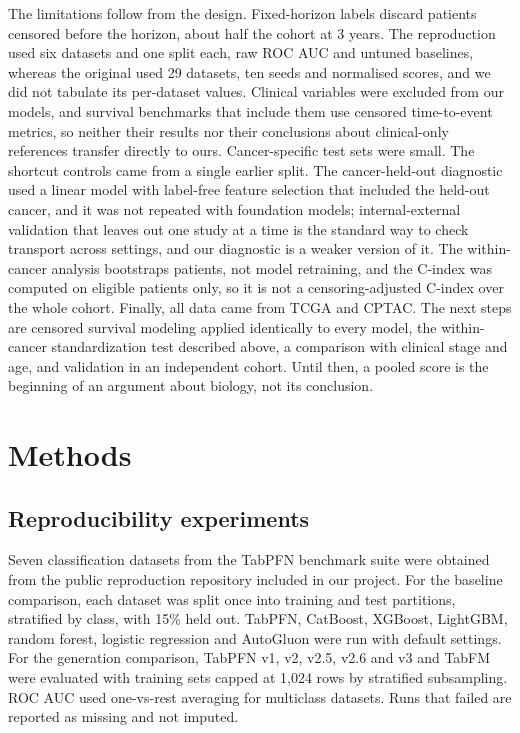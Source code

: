 \documentclass[11pt, a4paper, onecolumn, confidential, copyright]{hawkfranklin}
\begin{document}
The limitations follow from the design. Fixed-horizon labels discard patients censored before the horizon, about half the cohort at 3 years. The reproduction used six datasets and one split each, raw ROC AUC and untuned baselines, whereas the original used 29 datasets, ten seeds and normalised scores, and we did not tabulate its per-dataset values. Clinical variables were excluded from our models, and survival benchmarks that include them use censored time-to-event metrics, so neither their results nor their conclusions about clinical-only references transfer directly to ours.\citep{herrmann2021benchmark,li2024combining} Cancer-specific test sets were small. The shortcut controls came from a single earlier split. The cancer-held-out diagnostic used a linear model with label-free feature selection that included the held-out cancer, and it was not repeated with foundation models; internal-external validation that leaves out one study at a time is the standard way to check transport across settings,\citep{riley2016external} and our diagnostic is a weaker version of it. The within-cancer analysis bootstraps patients, not model retraining, and the C-index was computed on eligible patients only, so it is not a censoring-adjusted C-index over the whole cohort. Finally, all data came from TCGA and CPTAC. The next steps are censored survival modeling applied identically to every model, the within-cancer standardization test described above, a comparison with clinical stage and age, and validation in an independent cohort. Until then, a pooled score is the beginning of an argument about biology, not its conclusion.

\section*{Methods}

\subsection*{Reproducibility experiments}
Seven classification datasets from the TabPFN benchmark suite were obtained from the public reproduction repository included in our project. For the baseline comparison, each dataset was split once into training and test partitions, stratified by class, with 15\% held out. TabPFN, CatBoost, XGBoost, LightGBM, random forest, logistic regression and AutoGluon were run with default settings. For the generation comparison, TabPFN v1, v2, v2.5, v2.6 and v3 and TabFM were evaluated with training sets capped at 1,024 rows by stratified subsampling. ROC AUC used one-vs-rest averaging for multiclass datasets. Runs that failed are reported as missing and not imputed.
\end{document}
